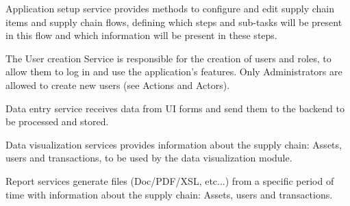 Application setup service provides methods to configure and edit  supply chain items and supply chain flows, defining which steps and sub-tasks will be present in this flow and which information will be present in these steps.

The User creation Service is responsible for the creation of users and roles, to allow them to log in and use the application’s features. Only Administrators are allowed to create new users (see Actions and Actors).

Data entry service receives data from UI forms and send them to the backend to be processed and stored.

Data visualization services provides information about the supply chain: Assets, users and transactions, to be used by the data visualization module.

Report services generate files (Doc/PDF/XSL, etc...) from a specific period of time with information about the supply chain: Assets, users and transactions.